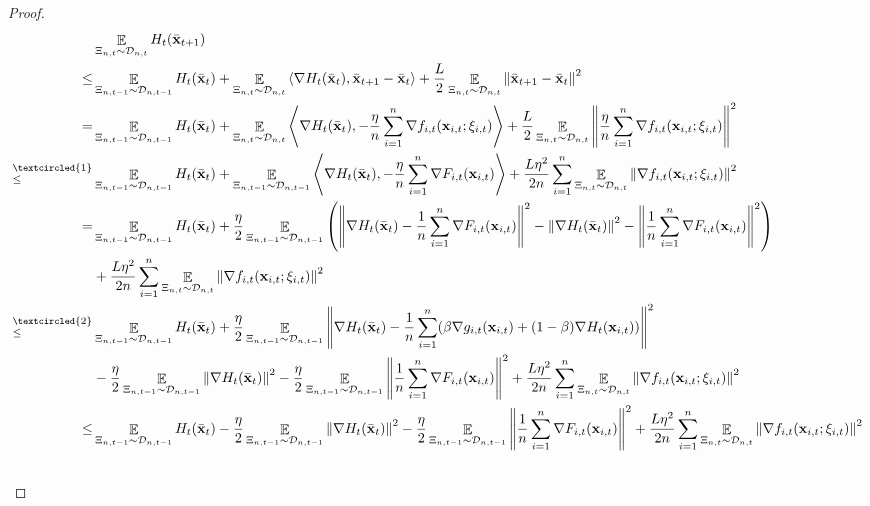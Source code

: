 \documentclass{article}
\begin{document}
\begin{proof}
\begin{align}
\nonumber
& \EE_{ \Xi_{n,t} \sim \Dcal_{n,t} } H_t(\bar{\x}_{t+1}) \\ \nonumber
\le & \EE_{ \Xi_{n,t-1} \sim \Dcal_{n,t-1} } H_t(\bar{\x}_t) + \EE_{ \Xi_{n,t} \sim \Dcal_{n,t} }\lrangle{\nabla H_t(\bar{\x}_t), \bar{\x}_{t+1} - \bar{\x}_t} + \frac{L}{2}\EE_{ \Xi_{n,t} \sim \Dcal_{n,t} }\lrnorm{\bar{\x}_{t+1} - \bar{\x}_t}^2 \\ \nonumber
= & \EE_{ \Xi_{n,t-1} \sim \Dcal_{n,t-1} } H_t(\bar{\x}_t) + \EE_{ \Xi_{n,t} \sim \Dcal_{n,t} }\lrangle{\nabla H_t(\bar{\x}_t), -\frac{\eta}{n}\sum_{i=1}^n \nabla f_{i,t}(\x_{i,t};\xi_{i,t})} + \frac{L}{2} \EE_{ \Xi_{n,t} \sim \Dcal_{n,t} }\lrnorm{\frac{\eta}{n}\sum_{i=1}^n \nabla f_{i,t}(\x_{i,t};\xi_{i,t})}^2 \\ \nonumber
\refabovecir{\le}{\textcircled{1}} & \EE_{ \Xi_{n,t-1} \sim \Dcal_{n,t-1} } H_t(\bar{\x}_t) + \EE_{ \Xi_{n,t-1} \sim \Dcal_{n,t-1} } \lrangle{\nabla H_t(\bar{\x}_t), -\frac{\eta}{n}\sum_{i=1}^n \nabla F_{i,t}(\x_{i,t})} + \frac{L\eta^2}{2n}\sum_{i=1}^n\EE_{ \Xi_{n,t} \sim \Dcal_{n,t} }\lrnorm{ \nabla f_{i,t}(\x_{i,t};\xi_{i,t})}^2 \\ \nonumber
= & \EE_{ \Xi_{n,t-1} \sim \Dcal_{n,t-1} } H_t(\bar{\x}_t) + \frac{\eta}{2}\EE_{ \Xi_{n,t-1} \sim \Dcal_{n,t-1} } \lrincir{ \lrnorm{\nabla H_t(\bar{\x}_t) -\frac{1}{n}\sum_{i=1}^n \nabla F_{i,t}(\x_{i,t})}^2 - \lrnorm{\nabla H_t(\bar{\x}_t)}^2 - \lrnorm{\frac{1}{n}\sum_{i=1}^n \nabla F_{i,t}(\x_{i,t})}^2 } \\ \nonumber 
& + \frac{L\eta^2}{2n}\sum_{i=1}^n\EE_{ \Xi_{n,t} \sim \Dcal_{n,t} }\lrnorm{ \nabla f_{i,t}(\x_{i,t};\xi_{i,t})}^2 \\ \nonumber
\refabovecir{\le}{\textcircled{2}} & \EE_{ \Xi_{n,t-1} \sim \Dcal_{n,t-1} } H_t(\bar{\x}_t) + \frac{\eta}{2}\EE_{ \Xi_{n,t-1} \sim \Dcal_{n,t-1} } \lrnorm{\nabla H_t(\bar{\x}_t) -\frac{1}{n}\sum_{i=1}^n (\beta \nabla g_{i,t}(\x_{i,t}) + (1-\beta)\nabla H_t(\x_{i,t}))}^2 \\ \nonumber 
& - \frac{\eta}{2}\EE_{ \Xi_{n,t-1} \sim \Dcal_{n,t-1} } \lrnorm{\nabla H_t(\bar{\x}_t)}^2 - \frac{\eta}{2}\EE_{ \Xi_{n,t-1} \sim \Dcal_{n,t-1} } \lrnorm{\frac{1}{n}\sum_{i=1}^n \nabla F_{i,t}(\x_{i,t})}^2 + \frac{L\eta^2}{2n}\sum_{i=1}^n\EE_{ \Xi_{n,t} \sim \Dcal_{n,t} }\lrnorm{ \nabla f_{i,t}(\x_{i,t};\xi_{i,t})}^2 \\ \nonumber
\le & \EE_{ \Xi_{n,t-1} \sim \Dcal_{n,t-1} } H_t(\bar{\x}_t) - \frac{\eta}{2}\EE_{ \Xi_{n,t-1} \sim \Dcal_{n,t-1} }\lrnorm{\nabla H_t(\bar{\x}_t)}^2 - \frac{\eta}{2}\EE_{ \Xi_{n,t-1} \sim \Dcal_{n,t-1} }\lrnorm{\frac{1}{n}\sum_{i=1}^n \nabla F_{i,t}(\x_{i,t})}^2  + \frac{L\eta^2}{2n}\sum_{i=1}^n\EE_{ \Xi_{n,t} \sim \Dcal_{n,t} }\lrnorm{ \nabla f_{i,t}(\x_{i,t};\xi_{i,t})}^2 \\ \nonumber

\end{align}
\end{proof}
\end{document}
